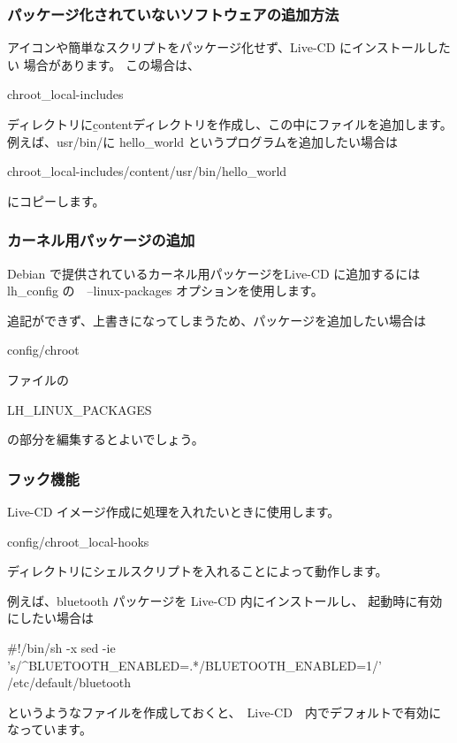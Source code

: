\documentclass[mingoth,a4paper]{jsarticle}
\begin{document}
\subsubsection{パッケージ化されていないソフトウェアの追加方法}
アイコンや簡単なスクリプトをパッケージ化せず、Live-CD にインストールしたい
場合があります。
この場合は、
\begin{commandline}
chroot_local-includes
\end{commandline}
ディレクトリに{\b content}ディレクトリを作成し、この中にファイルを追加します。
例えば、usr/bin/に hello\_world というプログラムを追加したい場合は
\begin{commandline}
chroot_local-includes/content/usr/bin/hello_world
\end{commandline}
にコピーします。

\subsubsection{カーネル用パッケージの追加}

Debian で提供されているカーネル用パッケージをLive-CD に追加するには
lh\_config の　--linux-packages オプションを使用します。
\begin{commandline}
\end{commandline}

追記ができず、上書きになってしまうため、パッケージを追加したい場合は
\begin{commandline}
config/chroot
\end{commandline}
ファイルの
\begin{commandline}
LH_LINUX_PACKAGES
\end{commandline}
の部分を編集するとよいでしょう。

\subsubsection{フック機能}
Live-CD イメージ作成に処理を入れたいときに使用します。

\begin{commandline}
config/chroot_local-hooks
\end{commandline}
ディレクトリにシェルスクリプトを入れることによって動作します。

例えば、bluetooth パッケージを Live-CD 内にインストールし、
起動時に有効にしたい場合は

\begin{commandline}
#!/bin/sh -x
sed -ie 's/^BLUETOOTH_ENABLED=.*/BLUETOOTH_ENABLED=1/' /etc/default/bluetooth
\end{commandline}
というようなファイルを作成しておくと、　Live-CD　内でデフォルトで有効になっています。
\end{document}
